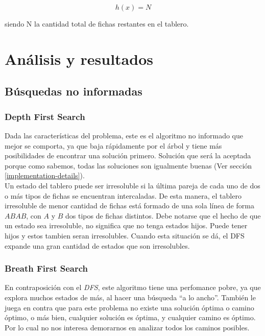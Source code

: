 \documentclass[a4paper,10pt]{article}
\begin{document}
    \[ h(x) = N \] 

    siendo N la cantidad total de fichas restantes en el tablero.

\section{Análisis y resultados}

\subsection{Búsquedas no informadas}

    \subsubsection{Depth First Search}
    \label{sec:dfs}
    Dada las características del problema, este es el algoritmo no informado que mejor se comporta, ya que baja rápidamente por el árbol y tiene más posibilidades de encontrar una solución primero.
    Solución que será la aceptada porque como sabemos, todas las soluciones son igualmente buenas (Ver sección \ref{implementation-details}).\\

    Un estado del tablero puede ser irresoluble si la última pareja de cada uno de dos o más tipos de fichas se encuentran intercaladas.
    De esta manera, el tablero irresoluble de menor cantidad de fichas está formado de una sola línea de forma $ABAB$, con $A$ y $B$ dos tipos de fichas distintos.
    Debe notarse que el hecho de que un estado sea irresoluble, no significa que no tenga estados hijos.
    Puede tener hijos y estos tambien seran irresolubles.
    Cuando esta situación se dá, el DFS expande una gran cantidad de estados que son irresolubles.

    
    \subsubsection{Breath First Search}
    En contraposición con el \textit{DFS}, este algoritmo tiene una perfomance pobre, ya que explora muchos estados de más, al hacer una búsqueda ``a lo ancho''.
    También le juega en contra que para este problema no existe una solución óptima o camino óptimo, o más bien, cualquier solución es óptima, y cualquier camino es óptimo. 
    Por lo cual no nos interesa demorarnos en analizar todos los caminos posibles.
\end{document}
